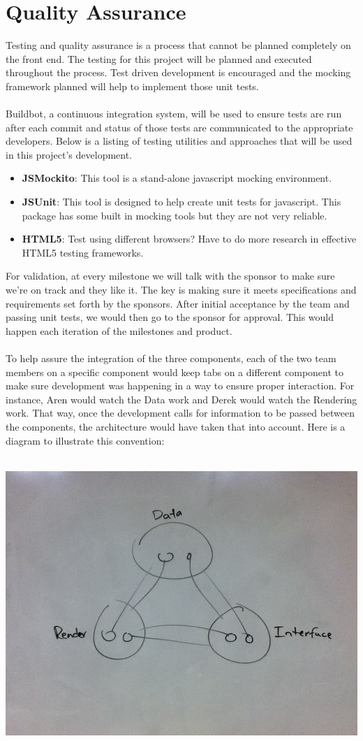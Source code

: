 \documentclass[12pt, letterpaper]{article}
\begin{document}
\section{Quality Assurance}
    Testing and quality assurance is a process that cannot be planned completely on the front end. The testing for this project will be planned and executed throughout the process. Test driven development is encouraged and the mocking framework planned will help to implement those unit tests.
	\\\\
	Buildbot, a continuous integration system, will be used to ensure tests are run after each commit and status of those tests are communicated to the appropriate developers. Below is a listing of testing utilities and approaches that will be used in this project's development.
\begin{itemize}
    \item {\bf JSMockito}: This tool is a stand-alone javascript mocking
    environment. 
    \item {\bf JSUnit}: This tool is designed to help create unit tests for
    javascript. This package has some built in mocking tools but they are not
    very reliable.
    \item {\bf HTML5}: Test using different browsers? Have to do more research
    in effective HTML5 testing frameworks.
\end{itemize}
	For validation, at every milestone we will talk with the sponsor to make sure we're on track and they like it. The key is making sure it meets specifications and requirements set forth by the sponsors. After initial acceptance by the team and passing unit tests, we would then go to the sponsor for approval. This would happen each iteration of the milestones and product.
	\\\\
	To help assure the integration of the three components, each of the two team members on a specific component would keep tabs on a different component to make sure development was happening in a way to ensure proper interaction. For instance, Aren would watch the Data work and Derek would watch the Rendering work. That way, once the development calls for information to be passed between the components, the architecture would have taken that into account. Here is a diagram to illustrate this convention:\\\\

\begin{center}
	\includegraphics[width=1\textwidth]{./whiteboards/portion-checks}
\end{center}
\end{document}

